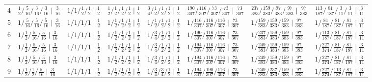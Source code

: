 \documentclass[11pt,a4paper]{article}
\theoremstyle{plain}
\theoremstyle{definition}
\theoremstyle{remark}
\begin{document}
\begin{table}[H]
{\begin{tabular}{rlllllll}
4 & $\tfrac{1}{2}/\tfrac{5}{16}/\tfrac{3}{16}/\tfrac{3}{16} \mid \tfrac{3}{16}$ & $1/1/\tfrac{1}{2}/\tfrac{1}{2} \mid \tfrac{1}{2}$ & $\tfrac{1}{2}/\tfrac{1}{2}/\tfrac{1}{2}/\tfrac{1}{2} \mid \tfrac{1}{2}$ & $\tfrac{3}{4}/\tfrac{1}{2}/\tfrac{1}{2}/\tfrac{1}{2} \mid \tfrac{1}{2}$ & $\tfrac{190}{307}/\tfrac{116}{307}/\tfrac{73}{307}/\tfrac{73}{307} \mid \tfrac{73}{307}$ & $\tfrac{237}{383}/\tfrac{159}{383}/\tfrac{97}{383}/\tfrac{97}{383} \mid \tfrac{97}{383}$ & $\tfrac{113}{187}/\tfrac{81}{187}/\tfrac{3}{11}/\tfrac{3}{11} \mid \tfrac{3}{11}$\\
5 & $1/\tfrac{5}{16}/\tfrac{5}{16}/\tfrac{5}{16} \mid \tfrac{3}{16}$ & $1/1/1/1 \mid \tfrac{1}{2}$ & $1/\tfrac{1}{2}/\tfrac{1}{2}/\tfrac{1}{2} \mid \tfrac{1}{2}$ & $1/\tfrac{1}{2}/\tfrac{1}{2}/\tfrac{1}{2} \mid \tfrac{1}{2}$ & $1/\tfrac{116}{307}/\tfrac{116}{307}/\tfrac{116}{307} \mid \tfrac{73}{307}$ & $1/\tfrac{159}{383}/\tfrac{159}{383}/\tfrac{159}{383} \mid \tfrac{97}{383}$ & $1/\tfrac{81}{187}/\tfrac{81}{187}/\tfrac{81}{187} \mid \tfrac{3}{11}$\\
6 & $1/\tfrac{1}{2}/\tfrac{5}{16}/\tfrac{5}{16} \mid \tfrac{3}{16}$ & $1/1/1/1 \mid \tfrac{1}{2}$ & $1/\tfrac{1}{2}/\tfrac{1}{2}/\tfrac{1}{2} \mid \tfrac{1}{2}$ & $1/\tfrac{3}{4}/\tfrac{1}{2}/\tfrac{1}{2} \mid \tfrac{1}{2}$ & $1/\tfrac{190}{307}/\tfrac{116}{307}/\tfrac{116}{307} \mid \tfrac{73}{307}$ & $1/\tfrac{237}{383}/\tfrac{159}{383}/\tfrac{159}{383} \mid \tfrac{97}{383}$ & $1/\tfrac{113}{187}/\tfrac{81}{187}/\tfrac{81}{187} \mid \tfrac{3}{11}$\\
7 & $1/\tfrac{1}{2}/\tfrac{5}{16}/\tfrac{5}{16} \mid \tfrac{3}{16}$ & $1/1/1/1 \mid \tfrac{1}{2}$ & $1/\tfrac{1}{2}/\tfrac{1}{2}/\tfrac{1}{2} \mid \tfrac{1}{2}$ & $1/\tfrac{3}{4}/\tfrac{1}{2}/\tfrac{1}{2} \mid \tfrac{1}{2}$ & $1/\tfrac{194}{307}/\tfrac{116}{307}/\tfrac{116}{307} \mid \tfrac{73}{307}$ & $1/\tfrac{249}{383}/\tfrac{159}{383}/\tfrac{159}{383} \mid \tfrac{97}{383}$ & $1/\tfrac{227}{374}/\tfrac{81}{187}/\tfrac{81}{187} \mid \tfrac{3}{11}$\\
8 & $1/\tfrac{1}{2}/\tfrac{5}{16}/\tfrac{5}{16} \mid \tfrac{3}{16}$ & $1/1/1/1 \mid \tfrac{1}{2}$ & $1/\tfrac{1}{2}/\tfrac{1}{2}/\tfrac{1}{2} \mid \tfrac{1}{2}$ & $1/\tfrac{3}{4}/\tfrac{1}{2}/\tfrac{1}{2} \mid \tfrac{1}{2}$ & $1/\tfrac{194}{307}/\tfrac{116}{307}/\tfrac{116}{307} \mid \tfrac{73}{307}$ & $1/\tfrac{249}{383}/\tfrac{159}{383}/\tfrac{159}{383} \mid \tfrac{97}{383}$ & $1/\tfrac{227}{374}/\tfrac{81}{187}/\tfrac{81}{187} \mid \tfrac{3}{11}$\\
9 & $1/\tfrac{1}{2}/\tfrac{1}{2}/\tfrac{5}{16} \mid \tfrac{3}{16}$ & $1/1/1/1 \mid \tfrac{1}{2}$ & $1/\tfrac{1}{2}/\tfrac{1}{2}/\tfrac{1}{2} \mid \tfrac{1}{2}$ & $1/\tfrac{3}{4}/\tfrac{3}{4}/\tfrac{1}{2} \mid \tfrac{1}{2}$ & $1/\tfrac{194}{307}/\tfrac{190}{307}/\tfrac{116}{307} \mid \tfrac{73}{307}$ & $1/\tfrac{249}{383}/\tfrac{237}{383}/\tfrac{159}{383} \mid \tfrac{97}{383}$ & $1/\tfrac{227}{374}/\tfrac{113}{187}/\tfrac{81}{187} \mid \tfrac{3}{11}$\\

\end{tabular}}
\end{table}
\end{document}
